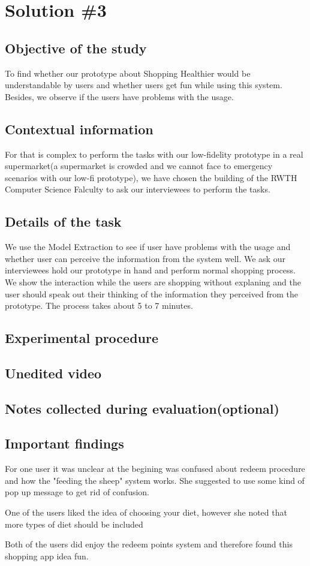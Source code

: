 \section{Solution \#3}

\subsection{Objective of the study}
To find whether our prototype about Shopping Healthier would be understandable by users and whether users get fun while using this system. Besides, we observe if the users have problems with the usage.

\subsection{Contextual information}
For that is complex to perform the tasks with our low-fidelity prototype in a real supermarket(a supermarket is crowded and we cannot face to emergency scenarios with our low-fi prototype), we have chosen the building of the RWTH Computer Science Falculty to ask our interviewees to perform the tasks.

\subsection{Details of the task}
We use the Model Extraction to see if user have problems with the usage and whether user can  perceive the information from the system well. We ask our interviewees hold our prototype in hand and perform normal shopping process. We show the interaction while the users are shopping without explaning and the user should speak out their thinking of the information they perceived from the prototype. The process takes about 5 to 7 minutes.

\subsection{Experimental procedure}


\subsection{Unedited video}

\subsection{Notes collected during evaluation(optional)}

\subsection{Important findings}
 \item For one user it was unclear at the begining was confused about redeem procedure and how the "feeding the sheep" system
works. She suggested to use some kind of pop up message to get rid of confusion.
 \item One of the users liked the idea of choosing your diet, however she noted that more types of diet should be included
 \item Both of the users did enjoy the redeem points system and therefore found this shopping app idea fun.
